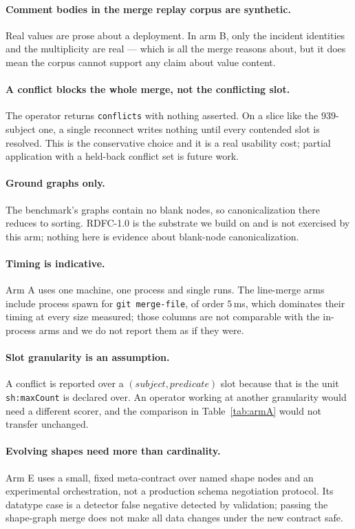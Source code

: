 \paragraph{Comment bodies in the merge replay corpus are synthetic.} Real values are prose
about a deployment. In arm B, only the incident identities and the multiplicity are real --- which is all the merge
reasons about, but it does mean the corpus cannot support any claim about value
content.

\paragraph{A conflict blocks the whole merge, not the conflicting slot.} The
operator returns \texttt{conflicts} with nothing asserted. On a slice like the
$939$-subject one, a single reconnect writes nothing until every contended slot
is resolved. This is the conservative choice and it is a real usability cost;
partial application with a held-back conflict set is future work.

\paragraph{Ground graphs only.} The benchmark's graphs contain no blank nodes,
so canonicalization there reduces to sorting. RDFC-1.0 is the substrate we build
on and is not exercised by this arm; nothing here is evidence about blank-node
canonicalization.

\paragraph{Timing is indicative.} Arm A uses one machine, one process and single runs. The
line-merge arms include process spawn for \texttt{git merge-file}, of order
$5$\,ms, which dominates their timing at every size measured; those columns are
not comparable with the in-process arms and we do not report them as if they
were.

\paragraph{Slot granularity is an assumption.} A conflict is reported over a
$(subject, predicate)$ slot because that is the unit \texttt{sh:maxCount} is
declared over. An operator working at another granularity would need a different
scorer, and the comparison in Table~\ref{tab:armA} would not transfer unchanged.

\paragraph{Evolving shapes need more than cardinality.} Arm E uses a small,
fixed meta-contract over named shape nodes and an experimental orchestration,
not a production schema negotiation protocol. Its datatype case is a detector
false negative detected by validation; passing the shape-graph merge does not
make all data changes under the new contract safe.

